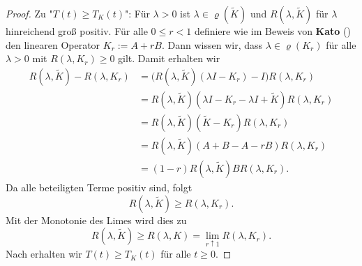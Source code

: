 \begin{proof}
\par
Zu "$T(t)\geq T_K(t)$": Für $\lambda >0$ ist $\lambda\in \varrho(\widetilde{K})$ und  $R(\lambda, \widetilde{K})$ für $\lambda$ hinreichend groß positiv. Für alle $0\leq r <1$ definiere wie im Beweis von \textbf{Kato} () den linearen Operator $K_r:=A+rB$. Dann wissen wir, dass $\lambda\in\varrho(K_r)$ für alle $\lambda>0$ mit $R(\lambda, K_r)\geq0$ gilt. Damit erhalten wir
\begin{align*}
R(\lambda, \widetilde{K}) - R(\lambda, K_r)
&= \big(R(\lambda, \widetilde{K})(\lambda I- K_r)-I\big)R(\lambda, K_r)\\
&= R(\lambda, \widetilde{K})(\lambda I- K_r - \lambda I+  \widetilde{K})R(\lambda, K_r)\\
&= R(\lambda, \widetilde{K})(\widetilde{K} - K_r)R(\lambda, K_r)\\
&= R(\lambda, \widetilde{K})(A+B - A - rB)R(\lambda, K_r)\\
&= (1-r)R(\lambda, \widetilde{K})BR(\lambda,  K_r).
\end{align*}
Da alle beteiligten Terme positiv sind, folgt
\begin{equation*}
R(\lambda, \widetilde{K})\geq R(\lambda, K_r).
\end{equation*}
Mit der Monotonie des Limes wird dies zu
\begin{equation*}
R(\lambda, \widetilde{K})\geq R(\lambda, K) = \lim_{r\uparrow 1}R(\lambda, K_r).
\end{equation*}
Nach  erhalten wir $T(t)\geq T_K(t)$ für alle $t\geq0$.
\end{proof}


